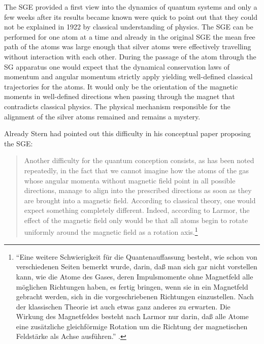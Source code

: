 \documentclass[12pt]{article}
\begin{document}
The SGE provided a first view into the dynamics of quantum systems and only a few weeks after its results became known \cite{EinsteinAEtAl1922Bemerkungen} were quick to point out that they could not be explained in 1922 by classical understanding of physics. The SGE can be performed for one atom at a time and already in the original SGE the mean free path of the atoms was large enough that silver atoms were effectively travelling without interaction with each other. During the passage of the atom through the SG apparatus one would expect that the dynamical conservation laws of momentum and angular momentum strictly apply yielding well-defined classical trajectories for the atoms. It would only be the orientation of the magnetic moments in well-defined directions when passing through the magnet that contradicts classical physics. The physical mechanism responsible for the alignment of the silver atoms remained and remains a mystery.

Already Stern had pointed out this difficulty in his conceptual paper proposing the SGE:
\begin{quote}
Another difficulty for the quantum conception consists, as has been noted repeatedly, in the fact that we cannot imagine how the atoms of the gas whose angular momenta without magnetic field point in all possible directions, manage to align into the prescribed directions as soon as they are brought into a magnetic field. According to classical theory, one would expect something completely different. Indeed, according to Larmor, the effect of the magnetic field only would be that all atoms begin to rotate uniformly around  the magnetic field as a rotation axis.\footnote{``Eine weitere Schwierigkeit für die Quantenauffassung besteht, wie schon von verschiedenen Seiten bemerkt wurde, darin, daß man sich gar nicht vorstellen kann, wie die Atome des Gases, deren Impulsmomente ohne Magnetfeld alle möglichen Richtungen haben, es fertig bringen, wenn sie in ein Magnetfeld gebracht werden, sich in die vorgeschriebenen Richtungen einzustellen. Nach der klassischen Theorie ist auch etwas ganz anderes zu erwarten. Die Wirkung des Magnetfeldes besteht nach Larmor nur darin, daß alle Atome eine zusätzliche gleichförmige Rotation um die Richtung der magnetischen Feldstärke als Achse ausführen.'' \cite[p.~250]{SternO1921Weg}.}
\end{quote}
\end{document}
